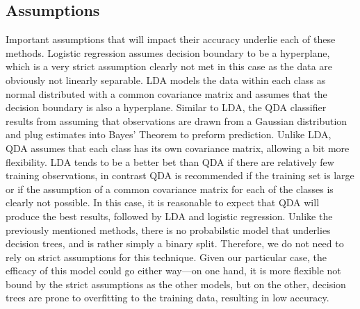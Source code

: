 \documentclass[12pt]{article}
\begin{document}
\subsection{Assumptions}
Important assumptions that will impact their accuracy underlie each of these methods. Logistic regression assumes decision boundary to be a hyperplane, which is a very strict assumption clearly not met in this case as the data are obviously not linearly separable. LDA models the data within each class as normal distributed with a common covariance matrix and assumes that the decision boundary is also a hyperplane. Similar to LDA, the QDA classifier results from assuming that observations are drawn from a Gaussian distribution and plug estimates into Bayes' Theorem to preform prediction. Unlike LDA, QDA assumes that each class has its own covariance matrix, allowing a bit more flexibility. LDA tends to be a better bet than QDA if there are relatively few training observations, in contrast QDA is recommended if the training set is large or if the assumption of a common covariance matrix for each of the classes is clearly not possible. In this case, it is reasonable to expect that QDA will produce the best results, followed by LDA and logistic regression. Unlike the previously mentioned methods, there is no probabilstic model that underlies decision trees, and is rather simply a binary split. Therefore, we do not need to rely on strict assumptions for this technique. Given our particular case, the efficacy of this model could go either way---on one hand, it is more flexible not bound by the strict assumptions as the other models, but on the other, decision trees are prone to overfitting to the training data, resulting in low accuracy.   
\end{document}
